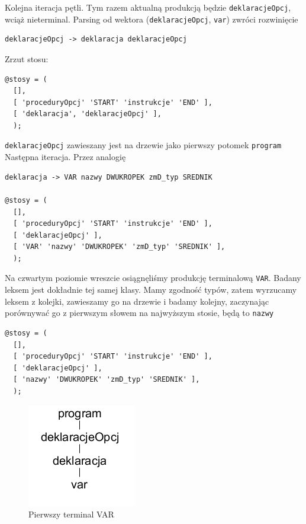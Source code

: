 \documentclass[a4paper,12pt]{article}
\begin{document}
Kolejna iteracja pętli. Tym razem aktualną produkcją będzie \verb|deklaracjeOpcj|, wciąż nieterminal. Parsing od wektora (\verb|deklaracjeOpcj|, \verb|var|) zwróci rozwinięcie
\begin{verbatim}
deklaracjeOpcj -> deklaracja deklaracjeOpcj
\end{verbatim}
Zrzut stosu:
\begin{verbatim}
@stosy = (
  [],
  [ 'proceduryOpcj' 'START' 'instrukcje' 'END' ],
  [ 'deklaracja', 'deklaracjeOpcj' ],
  );
\end{verbatim}
\verb|deklaracjeOpcj| zawieszany jest na drzewie jako pierwszy potomek \verb|program|
Następna iteracja. Przez analogię
\begin{verbatim}
deklaracja -> VAR nazwy DWUKROPEK zmD_typ SREDNIK

@stosy = (
  [],
  [ 'proceduryOpcj' 'START' 'instrukcje' 'END' ],
  [ 'deklaracjeOpcj' ],
  [ 'VAR' 'nazwy' 'DWUKROPEK' 'zmD_typ' 'SREDNIK' ],
  );
\end{verbatim}
Na czwartym poziomie wreszcie osiągnęliśmy produkcję terminalową \verb|VAR|. Badany leksem jest dokładnie tej samej klasy. Mamy zgodność typów, zatem wyrzucamy leksem z kolejki, zawieszamy go na drzewie i badamy kolejny, zaczynając porównywać go z pierwszym słowem na najwyższym stosie, będą to \verb|nazwy|
\begin{verbatim}
@stosy = (
  [],
  [ 'proceduryOpcj' 'START' 'instrukcje' 'END' ],
  [ 'deklaracjeOpcj' ],
  [ 'nazwy' 'DWUKROPEK' 'zmD_typ' 'SREDNIK' ],
  );
\end{verbatim}
\begin{figure}[htb]
   \centering
   \includegraphics[scale=0.5,bb=0 0 180 170]{grafika/prosteDrzewo/program_deklaracjeOpcj_deklaracja_VAR.png}
   \caption{Pierwszy terminal VAR}
\end{figure}
\end{document}
